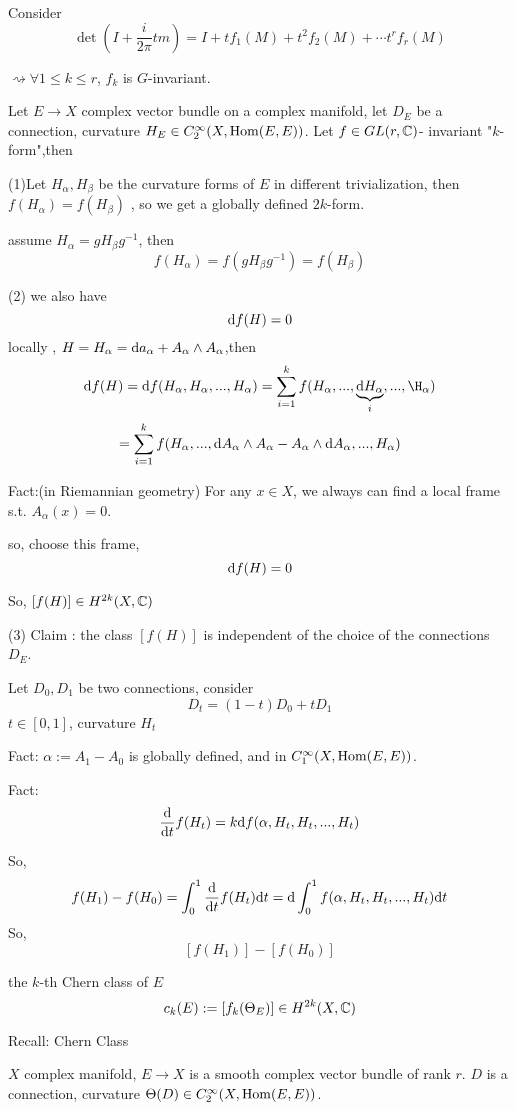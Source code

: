 Consider
$$\det(I+\frac{i}{2\pi}tm)=I+tf_1(M)+t^2f_2(M)+\cdots t^rf_r(M)$$

$\rightsquigarrow\forall 1\leq k\leq r$, $f_k$ is $G$-invariant.

Let $E\to X$ complex vector bundle on a complex manifold,
let $D_E$ be a connection,
curvature $H_E\in C_2^\infty(X,\operatorname{Hom}(E,E))$.
 Let $f\in GL(r,\mathbb{C})$- invariant "$k$-form",then

(1)Let $H_{\alpha},H_{\beta}$ be the curvature forms of $E$ in different trivialization,
then $f(H_\alpha)=f(H_{\beta})$ , so we get a globally defined $2k$-form.

assume $H_\alpha=gH_\beta g^{-1}$, then
$$f(H_\alpha)=f(g H_\beta g^{-1})=f(H_\beta)$$

(2) we also have
$$\mathrm{d} f(H)=0$$
locally , $H=H_\alpha=\mathrm{d} a_\alpha+A_\alpha\wedge A_\alpha$,then
$$\td f(H)=\td f(H_\alpha,H_\alpha,...,H_\alpha)
=\sum_{i=1}^kf(H_\alpha,...,\underbrace{\td H_\alpha}_{i},...,\H_\alpha)$$
$$
=\sum_{i=1}^kf(H_\alpha,...,\mathrm{d} A_\alpha\wedge A_\alpha-A_\alpha\wedge\mathrm{d} A_\alpha,...,H_\alpha)
$$

Fact:(in Riemannian geometry) For any $x\in X$,
we always can find a local frame s.t.
$A_\alpha(x)=0$.

so, choose this frame,
$$\mathrm{d} f(H)=0$$

So, $[f(H)]\in H^{2k}(X,\mathbb{C})$

(3) Claim : the class $[f(H)]$ is independent of the choice of the connections $D_E$.

Let $D_0,D_1$ be two connections, consider
$$D_t=(1-t)D_0+tD_1$$
$t\in[0,1]$, curvature $H_t$

Fact: $\alpha:=A_1-A_0$ is globally defined, and in $C_1^\infty(X,\operatorname{Hom}(E,E))$.

Fact: $$\frac{\mathrm{d}}{\mathrm{d} t}f(H_t)=k\mathrm{d} f(\alpha,H_t,H_t,...,H_t)$$

So,
$$f(H_1)-f(H_0)=
\int_0^1\frac{\mathrm{d}}{\mathrm{d} t}f(H_t)\mathrm{d} t
=\mathrm{d}\int_0^1f(\alpha,H_t,H_t,...,H_t)\mathrm{d} t$$
So,
$$[f(H_1)]-[f(H_0)]$$

\begin{definition}
the $k$-th Chern class of $E$
$$c_k(E):=[f_k(\Theta_E)]\in H^{2k}(X,\mathbb{C})$$
\end{definition}

Recall: Chern Class

$X$ complex manifold, $E\to X$ is a smooth complex vector bundle of rank $r$.
$D$ is a connection, curvature $\Theta(D)\in C_2^\infty(X,\operatorname{Hom}(E,E))$.

